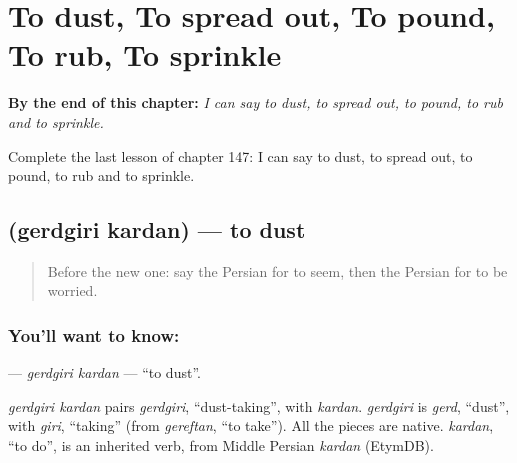 
\chapter{To dust, To spread out, To pound, To rub, To sprinkle}
\label{ch:fa-to-dust-to-spread-out-to-pound-to-rub-to-sprinkle}

\begin{chapteropening}
\textbf{By the end of this chapter:} \emph{I can say to dust, to spread out, to pound, to rub and to sprinkle.}

Complete the last lesson of chapter 147: I can say to dust, to spread out, to pound, to rub and to sprinkle.
\end{chapteropening}

\section[\texorpdfstring{\fa{گردگیری} \fa{کردن} (gerdgiri kardan)}{گردگیری کردن (gerdgiri kardan)}]{  (gerdgiri kardan) — to dust}

\label{lesson:FA-C147-gerdgiri-kardan}



\begin{quote}
Before the new one: say the Persian for to seem, then the Persian for to be worried.
\end{quote}

\subsection*{You'll want to know:  }
\textbf{ } — \emph{gerdgiri kardan} — \textquotedblleft{}to dust\textquotedblright{}.

\begin{cousinweb}
\emph{gerdgiri kardan} pairs \emph{gerdgiri}, \textquotedblleft{}dust-taking\textquotedblright{}, with \emph{kardan}. \emph{gerdgiri} is \emph{gerd}, \textquotedblleft{}dust\textquotedblright{}, with \emph{giri}, \textquotedblleft{}taking\textquotedblright{} (from \emph{gereftan}, \textquotedblleft{}to take\textquotedblright{}). All the pieces are native. \emph{kardan}, \textquotedblleft{}to do\textquotedblright{}, is an inherited verb, from Middle Persian \emph{kardan} (EtymDB).
\end{cousinweb}

